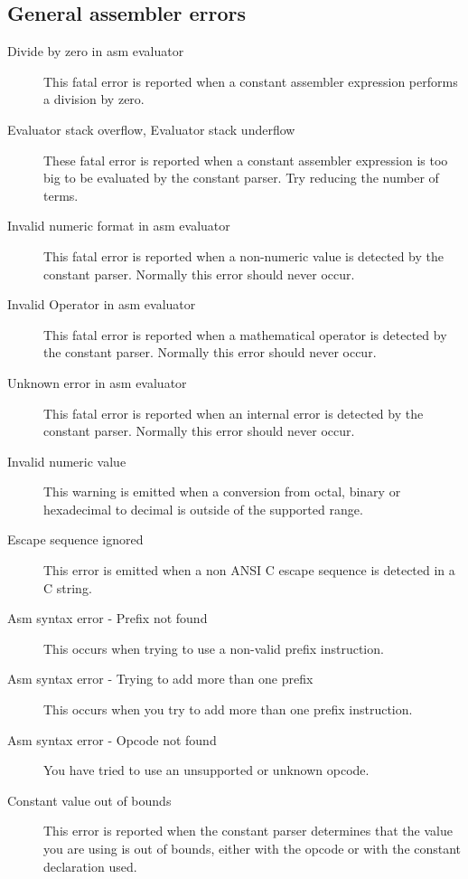 \subsection{General assembler errors}
\begin{description}
\item [Divide by zero in asm evaluator]
This fatal error is reported when a constant assembler expression
performs a division by zero.

\item [Evaluator stack overflow, Evaluator stack underflow]
These fatal error is reported when a constant assembler expression
is too big to be evaluated by the constant parser. Try reducing the
number of terms.

\item [Invalid numeric format in asm evaluator]
This fatal error is reported when a non-numeric value is detected
by the constant parser. Normally this error should never occur.

\item [Invalid Operator in asm evaluator]
This fatal error is reported when a mathematical operator is detected
by the constant parser. Normally this error should never occur.

\item [Unknown error in asm evaluator]
This fatal error is reported when an internal error is detected
by the constant parser. Normally this error should never occur.

\item [Invalid numeric value]
This warning is emitted when a conversion from octal, binary
or hexadecimal to decimal is outside of the supported range.

\item [Escape sequence ignored]
This error is emitted when a non ANSI C escape sequence is detected in
a C string.

\item [Asm syntax error - Prefix not found]
This occurs when trying to use a non-valid prefix instruction.

\item [Asm syntax error - Trying to add more than one prefix]
This occurs when you try to add more than one prefix instruction.

\item [Asm syntax error - Opcode not found]
You have tried to use an unsupported or unknown opcode.

\item [Constant value out of bounds]
This error is reported when the constant parser determines that the
value you are using is out of bounds, either with the opcode or with
the constant declaration used.


\end{description}
